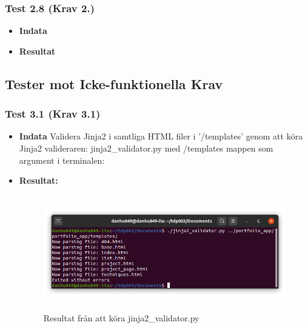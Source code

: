\documentclass{TDP003mall}
\begin{document}
\subsubsection*{Test 2.8 (Krav 2.)}
\begin{itemize}
\item[]\textbf{Indata}
\item[]\textbf{Resultat} 
\end{itemize}






\subsection{Tester mot Icke-funktionella Krav}
\subsubsection*{Test 3.1 (Krav 3.1)}
\begin{itemize}
\item[]\textbf{Indata} Validera Jinja2 i samtliga HTML filer i '/templates' genom att köra Jinja2 valideraren: jinja2\_validator.py med /templates mappen som argument i terminalen:
\item[]\textbf{Resultat:}
\begin{figure}[h]
\centerline{\includegraphics[width=\textwidth, height=5cm]{../Pictures/jinja2_validated.png}}
\caption{Resultat från att köra jinja2\_validator.py\label{fig:}}
\end{figure}
\end{itemize}
\end{document}
